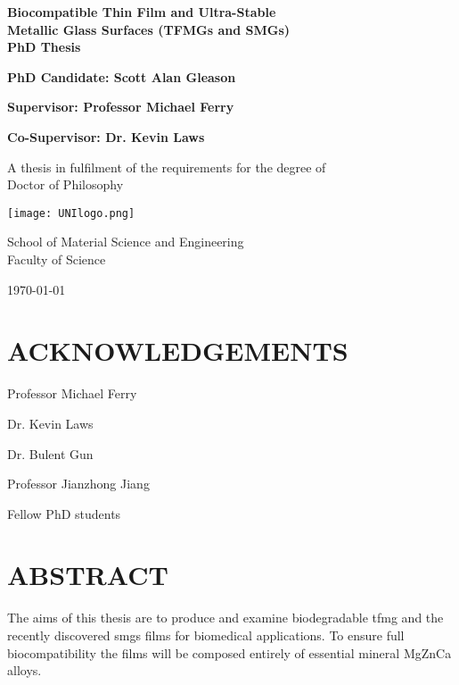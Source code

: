 \documentclass[draft,a4paper,12pt,oneside]{report}%
\begin{document}
\thispagestyle{empty} %
\begin{titlepage}
\begin{center}
\vspace*{1cm}
	
\textbf{\LARGE{Biocompatible Thin Film and Ultra-Stable\\Metallic Glass Surfaces (TFMGs and SMGs)}}\\
\textbf{PhD Thesis}

\vspace{2cm}

\textbf{\large{PhD Candidate: Scott Alan Gleason}}

\textbf{Supervisor: Professor Michael Ferry}

\textbf{Co-Supervisor: Dr. Kevin Laws}

\vspace{2cm}

A thesis in fulfilment of the requirements for the degree of \\
Doctor of Philosophy

\vspace{1.1cm}

\texttt{[image: UNIlogo.png]}
\label{fig:Unilogo}

\vspace{0.8cm}

School of Material Science and Engineering\\ Faculty of Science

\vspace{2cm}

\today
\end{center}
\end{titlepage}

\clearpage 
{}
\tableofcontents\newpage
\listoffigures\newpage
\listoftables\newpage
\clearpage %

\chapter*{ACKNOWLEDGEMENTS}
Professor Michael Ferry

Dr. Kevin Laws

Dr. Bulent Gun

Professor Jianzhong Jiang

Fellow PhD students

\chapter*{ABSTRACT}
The aims of this thesis are to produce and examine biodegradable \gls{tfmg} and the recently discovered \glspl{smg} films for biomedical applications. To ensure full biocompatibility the films will be composed entirely of essential mineral MgZnCa alloys.
\end{document}
